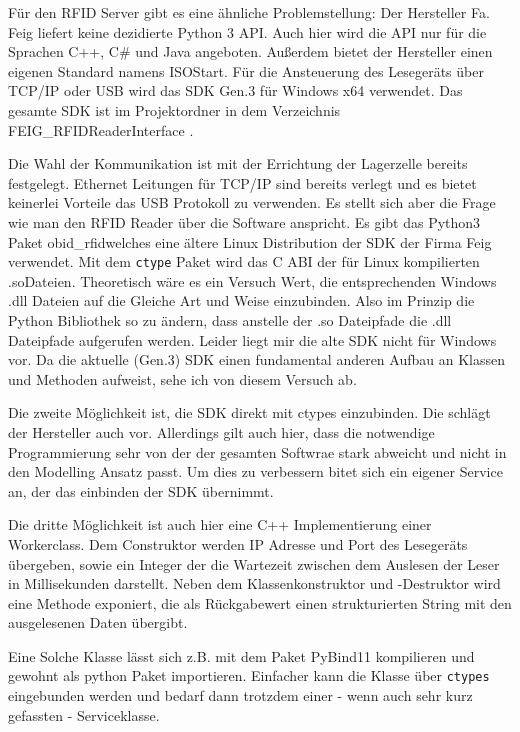 Für den RFID Server gibt es eine ähnliche Problemstellung: Der Hersteller Fa. Feig liefert keine dezidierte Python 3 API. Auch hier wird die API nur für die Sprachen 
C++, C\# und Java angeboten. Außerdem bietet der Hersteller einen eigenen Standard namens ISOStart. 
Für die Ansteuerung des Lesegeräts über TCP/IP oder USB wird das SDK Gen.3 für Windows x64 verwendet. 
Das gesamte SDK ist im Projektordner in dem Verzeichnis \glqq FEIG\_RFIDReaderInterface \grqq.

Die Wahl der Kommunikation ist mit der Errichtung der Lagerzelle bereits festgelegt. Ethernet Leitungen für TCP/IP sind bereits verlegt und es bietet keinerlei Vorteile das
USB Protokoll zu verwenden. 
Es stellt sich aber die Frage wie man den RFID Reader über die Software anspricht. 
Es gibt das Python3 Paket \glqq obid\_rfid\grqq welches eine ältere Linux Distribution der SDK der Firma Feig verwendet. 
Mit dem \verb|ctype| Paket wird das C ABI der für Linux kompilierten \glq .so\grq Dateien. Theoretisch wäre es ein Versuch Wert, die entsprechenden Windows \glq .dll \grq Dateien 
auf die Gleiche Art und Weise einzubinden. Also im Prinzip die Python Bibliothek so zu ändern, dass anstelle der \glq .so \grq Dateipfade die \glq .dll \grq Dateipfade aufgerufen werden. 
Leider liegt mir die alte SDK nicht für Windows vor. Da die aktuelle (Gen.3) SDK einen fundamental anderen Aufbau an Klassen und Methoden aufweist, sehe ich von diesem Versuch ab. 

Die zweite Möglichkeit ist, die SDK direkt mit ctypes einzubinden. Die schlägt der Hersteller auch vor. Allerdings gilt auch hier, dass die notwendige Programmierung sehr von der der gesamten Softwrae stark abweicht
und nicht in den Modelling Ansatz passt. Um dies zu verbessern bitet sich ein eigener Service an, der das einbinden der SDK übernimmt. 

Die dritte Möglichkeit ist auch hier eine C++ Implementierung einer Workerclass. Dem Construktor werden IP Adresse und Port des Lesegeräts übergeben, sowie ein Integer der die Wartezeit zwischen dem Auslesen der Leser in Millisekunden darstellt.
Neben dem Klassenkonstruktor und -Destruktor wird eine Methode exponiert, die als Rückgabewert einen strukturierten String mit den ausgelesenen Daten übergibt.

Eine Solche Klasse lässt sich z.B. mit dem Paket PyBind11 kompilieren und gewohnt als python Paket importieren. Einfacher kann die Klasse über \verb|ctypes| eingebunden
werden und bedarf dann trotzdem einer - wenn auch sehr kurz gefassten - Serviceklasse. 

